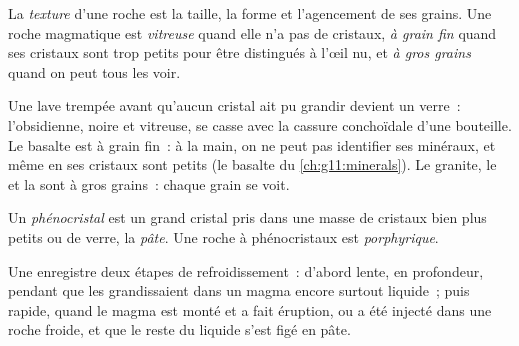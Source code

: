 \begin{definition}[Texture]\label{def:g11:igneous-rocks:texture}
La \emph{texture} d'une roche est la taille, la
forme et l'agencement de ses grains. Une roche magmatique est
\emph{vitreuse} quand elle n'a pas de cristaux, \emph{à grain fin} quand ses
cristaux sont trop petits pour être distingués à l'œil nu, et \emph{à gros
grains} quand on peut tous les voir.
\end{definition}

Une lave trempée avant qu'aucun cristal ait pu grandir devient un verre~:
l'obsidienne, noire et vitreuse, se casse avec la cassure conchoïdale d'une
bouteille. Le basalte est à grain fin~: à la main, on ne peut pas identifier
ses minéraux, et même en  ses cristaux sont petits (le basalte du
\cref{ch:g11:minerals}). Le granite, le  et la  sont à gros
grains~: chaque grain se voit.

\begin{definition}\label{def:g11:igneous-rocks:porphyritic}
Un \emph{phénocristal} est un grand cristal
pris dans une masse de cristaux bien plus petits ou de verre, la
\emph{pâte}. Une roche à phénocristaux est
\emph{porphyrique}.
\end{definition}

Une   enregistre deux étapes de refroidissement~: d'abord
lente, en profondeur, pendant que les  grandissaient dans un
magma encore surtout liquide~; puis rapide, quand le magma est monté et a
fait éruption, ou a été injecté dans une roche froide, et que le reste du
liquide s'est figé en pâte.

